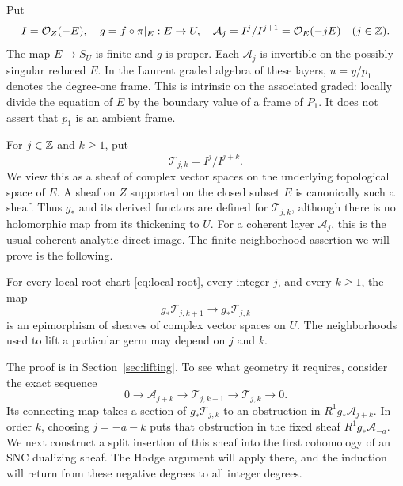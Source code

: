Put
\begin{equation}\label{eq:cover-layers}
 I=\mathcal O_Z(-E),\quad g=f\circ\pi|_E:E\to U,\quad
 \mathcal A_j=I^j/I^{j+1}=\mathcal O_E(-jE)\quad(j\in\mathbb Z).
\end{equation}
The map \(E\to S_U\) is finite and \(g\) is proper.  Each \(\mathcal A_j\)
is invertible on the possibly singular reduced \(E\).  In the Laurent
graded algebra of these layers, \(u=y/p_1\) denotes the degree-one frame.
This is intrinsic on the associated graded: locally divide the equation
of \(E\) by the boundary value of a frame of \(P_1\).  It does not assert
that \(p_1\) is an ambient frame.

For \(j\in\mathbb Z\) and \(k\geq1\), put
\begin{equation}\label{eq:truncations}
 \mathcal T_{j,k}=I^j/I^{j+k}.
\end{equation}
We view this as a sheaf of complex vector spaces on the underlying
topological space of \(E\).  A sheaf on \(Z\) supported on the closed
subset \(E\) is canonically such a sheaf.  Thus \(g_*\) and its derived
functors are defined for \(\mathcal T_{j,k}\), although there is no
holomorphic map from its thickening to \(U\).  For a coherent layer
\(\mathcal A_j\), this is the usual coherent analytic direct image.
The finite-neighborhood assertion we will prove is the following.

\begin{proposition}\label{prop:all-orders}
For every local root chart \eqref{eq:local-root}, every integer
\(j\), and every \(k\geq1\), the map
\begin{equation}\label{eq:all-order-surjection}
 g_*\mathcal T_{j,k+1}\longrightarrow g_*\mathcal T_{j,k}
\end{equation}
is an epimorphism of sheaves of complex vector spaces on \(U\).
The neighborhoods used to lift a particular germ may depend on \(j\)
and \(k\).
\end{proposition}

The proof is in Section~\ref{sec:lifting}.  To see what geometry it
requires, consider the exact sequence
\begin{equation}\label{eq:current-truncation-sequence}
 0\longrightarrow\mathcal A_{j+k}\longrightarrow\mathcal T_{j,k+1}
 \longrightarrow\mathcal T_{j,k}\longrightarrow0.
\end{equation}
Its connecting map takes a section of \(g_*\mathcal T_{j,k}\) to an
obstruction in \(R^1g_*\mathcal A_{j+k}\).  In order \(k\), choosing
\(j=-a-k\) puts that obstruction in the fixed sheaf
\(R^1g_*\mathcal A_{-a}\).  We next construct a split insertion of this
sheaf into the first cohomology of an SNC dualizing sheaf.  The Hodge
argument will apply there, and the induction will return from these
negative degrees to all integer degrees.

